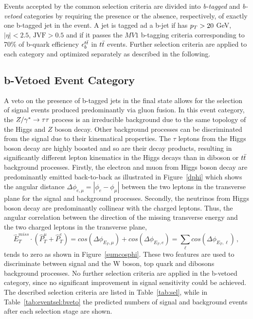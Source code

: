 Events accepted by the common selection criteria are divided into \emph{b-tagged} and \emph{b-vetoed}  categories by requiring the presence 
or the absence, respectively, of exactly one b-tagged jet  in the event. A jet is tagged  ad a b-jet if  has 
$p_{T} > 20$ GeV, $|\eta| < 2.5$, $\text{JVF} > 0.5$ and if it passes  the $MV1$ b-tagging criteria corresponding to 
70\% of b-quark efficiency $\epsilon_b^{t\bar{t}}$ in $t\bar{t}$ events. Further selection criteria
are applied to each category and optimized separately as described in the following.

\subsection{b-Vetoed Event Category}\label{sec:veto}

A veto on the presence of b-tagged jets in the final state allows for the selection of signal events
produced predominantly via gluon fusion. In this event category, the 
$Z/\gamma^*\rightarrow \tau\tau$  process is an irreducible background due to the same topology of the Higgs and $Z$ boson decay.
Other background processes can  be discriminated from the signal due to their kinematical properties.
The $\tau$ leptons from the Higgs boson decay are highly boosted and so are their decay products, resulting
in significantly different lepton kinematics in the Higgs decays than in  diboson or $t\bar{t}$ background processes. 
Firstly, the electron and muon from Higgs boson decay are predominantly 
emitted back-to-back as illustrated in Figure~\ref{dphi} which shows
the angular distance $\Delta\phi_{e,\mu} = |\phi_{e} - \phi_{\mu}|$  between the two leptons in the transverse plane 
for the signal and background processes. Secondly, the neutrinos from Higgs boson decay  are predominantly
collinear with the charged leptons. Thus, the angular correlation between the direction of the missing transverse energy 
and the two charged leptons in the transverse plane, 
$$ \hat{E}_{T}^{miss} \cdot ( \hat{P}_{T}^{\mu} + \hat{P}_{T}^{e} ) = cos(\Delta\phi_{E_{T},\mu}) 
+ cos(\Delta\phi_{E_{T},e}) = \sum_\ell cos(\Delta\phi_{E_{T},\ell}) \,,$$
tends to zero as shown in Figure~\ref{sumcosphi}. 
These two features are used to discriminate between  signal and the W boson, top quark and  dibosons background processes.
No further selection criteria are applied in the b-vetoed category, since  no significant improvement
in signal sensitivity could be achieved.
The described selection criteria are listed in Table~\ref{tab:sel}, while in Table~\ref{tab:eventsel:bveto}
the predicted numbers of signal and background events after each selection stage  are shown.


